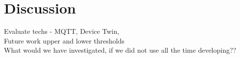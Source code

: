 \section{Discussion} \label{sec:discussion}
Evaluate techs - MQTT, Device Twin, 
\\Future work upper and lower thresholds
\\What would we have investigated, if we did not use all the time developing??





